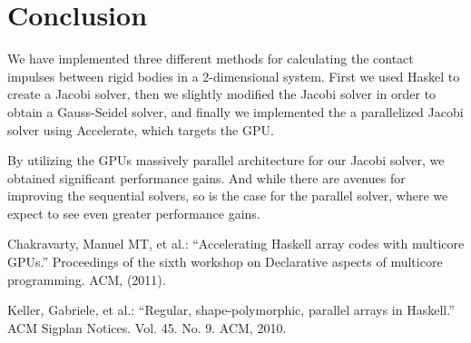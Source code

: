 \documentclass[runningheads,a4paper]{llncs}
\begin{document}
\section{Conclusion}

We have implemented three different methods for calculating the contact
impulses between rigid bodies in a 2-dimensional system. First we used Haskel
to create a Jacobi solver, then we slightly modified the Jacobi solver in order
to obtain a Gauss-Seidel solver, and finally we implemented the a parallelized
Jacobi solver using Accelerate, which targets the GPU.

By utilizing the GPUs massively parallel architecture for our Jacobi solver, we
obtained significant performance gains. And while there are avenues
for improving the sequential solvers, so is the case for the parallel solver,
where we expect to see even greater performance gains.

\begin{thebibliography}{4}
 Chakravarty, Manuel MT, et al.: ``Accelerating Haskell
  array codes with multicore GPUs.'' Proceedings of the sixth workshop on
  Declarative aspects of multicore programming. ACM, (2011).

 Keller, Gabriele, et al.: ``Regular, shape-polymorphic,
  parallel arrays in Haskell.'' ACM Sigplan Notices. Vol. 45. No. 9. ACM, 2010.
\end{thebibliography}
\end{document}
